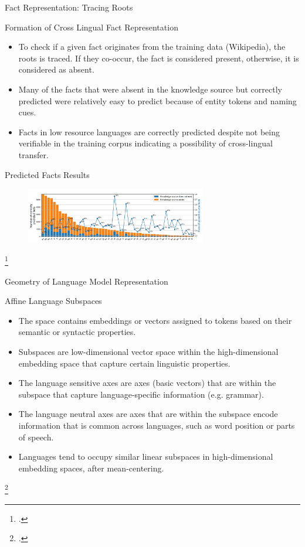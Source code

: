 \documentclass{beamer}
\begin{document}
	\begin{frame}{Fact Representation: Tracing Roots}
		\begin{block}{\scriptsize Formation of Cross Lingual Fact Representation}\scriptsize
			\begin{itemize}
				\item To check if a given fact originates from the training data (Wikipedia), the roots is traced. If they co-occur, the fact is considered present, otherwise, it is considered as absent. 
				\item Many of the facts that were absent in the knowledge source but correctly predicted were relatively easy to predict because of entity tokens and naming cues.
				\item Facts in low resource languages are correctly predicted despite not being verifiable in the training corpus indicating a possibility of cross-lingual transfer.
			\end{itemize}
		\end{block}
		\begin{block}{\scriptsize Predicted Facts Results\footnotemark}
			\begin{figure}
				\centering
				\includegraphics[width=0.7\textwidth]{pred-fact}
			\end{figure}
		\end{block}\footcitetext{zhao2024tracing}
	\end{frame}
	
	\begin{frame}{Geometry of Language Model Representation}
		\begin{block}{\scriptsize Affine Language Subspaces\footnotemark}\scriptsize
			\begin{itemize}
				\item The space contains embeddings or vectors assigned to tokens based on their semantic or syntactic properties. 
				\item Subspaces are low-dimensional vector space within the high-dimensional embedding space that capture certain linguistic properties. 
				\item The language sensitive axes are axes (basic vectors) that are within the subspace that capture language-specific information (e.g. grammar). 
				\item The language neutral axes are axes that are within the subspace encode information that is common across languages, such as word position or parts of speech.
				\item Languages tend to occupy similar linear subspaces in high-dimensional embedding spaces, after mean-centering.
			\end{itemize}
		\end{block}\footcitetext{chang2022geometry}
	\end{frame}
	
\end{document}
